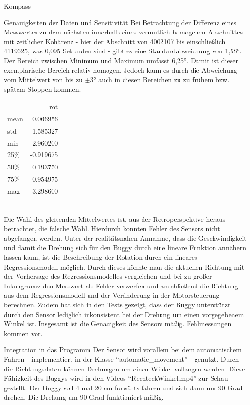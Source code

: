 \documentclass[12pt]{report}
\begin{document}
\begin{section}{Kompass}
\begin{subsection}{Genauigkeiten der Daten und Sensitivität}
  Bei Betrachtung der Differenz eines Messwertes zu dem nächsten innerhalb eines
  vermutlich homogenen Abschnittes mit zeitlicher Kohärenz - hier der
  Abschnitt von 4002107 bis einschließlich 4119625, was 0,095 Sekunden sind -
  gibt es eine Standardabweichung von 1,58\si{\degree}. Der Bereich zwischen Minimum
  und Maximum umfasst 6,25\si{\degree}. Damit ist dieser exemplarische Bereich relativ
  homogen. Jedoch kann es durch die Abweichung vom Mittelwert von bis zu $\pm
  3$\si{\degree} auch in diesen Bereichen zu zu frühem bzw. spätem Stoppen kommen.
  \\
  \begin{tabular}{lr}
    {} &        rot \\
    mean  &   0.066956 \\
    std   &   1.585327 \\
    min   &  -2.960200 \\
    25\%   &  -0.919675 \\
    50\%   &   0.193750 \\
    75\%   &   0.954975 \\
    max   &   3.298600 \\
  \end{tabular}
  \\

  Die Wahl des gleitenden Mittelwertes ist, aus der Retroperspektive heraus
  betrachtet, die falsche Wahl. Hierdurch konnten Fehler des Sensors nicht abgefangen
  werden. Unter der realitätsnahen Annahme, dass die Geschwindigkeit und damit
  die Drehung sich für den Buggy durch eine lineare Funktion annähern lassen
  kann, ist die Beschreibung der Rotation durch ein lineares Regressionsmodell möglich.
  Durch dieses könnte man die aktuellen Richtung mit der Vorhersage des
  Regressionsmodelles vergleichen und bei zu großer Inkongruenz den Messwert als
  Fehler verwerfen und anschließend die Richtung aus dem Regressionsmodell und der
  Veränderung in der Motorsteuerung berechnen.
  Zudem hat sich in den Tests gezeigt, dass der Buggy unterstützt durch den
  Sensor lediglich inkonsistent bei der Drehung um einen vorgegebenem Winkel ist.
  Insgesamt ist die Genauigkeit des Sensors mäßig. Fehlmessungen kommen vor.

  \end{subsection}
  \begin{subsection}{Integration in das Programm}
    Der Sensor wird vorallem bei dem automatischem Fahren - implementiert in der
    Klasse "`automatic\_movement"' - genutzt. Durch die
    Richtungsdaten können Drehungen um einen Winkel vollzogen werden. Diese
    Fähigkeit des Buggys wird in den Videos "`RechteckWinkel.mp4"' zur Schau
    gestellt. Der Buggy soll 4 mal 20 cm forwärts fahren und sich dann um 90
    Grad drehen. Die Drehung um 90 Grad funktioniert mäßig.


\end{subsection}
\end{section}
\end{document}
